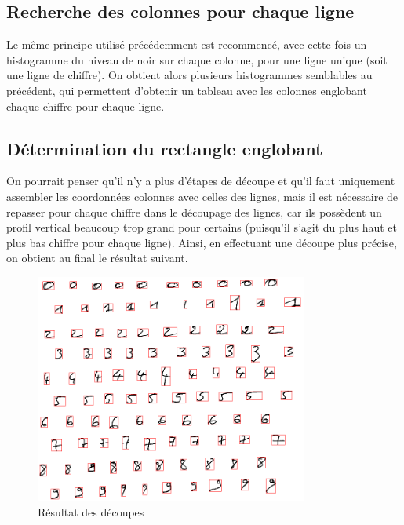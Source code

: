 \subsection{Recherche des colonnes pour chaque ligne}
Le même principe utilisé précédemment est recommencé, avec cette fois un histogramme du niveau de noir sur chaque colonne, pour une ligne unique (soit une ligne de chiffre). On obtient alors plusieurs histogrammes semblables au précédent, qui permettent d'obtenir un tableau avec les colonnes englobant chaque chiffre pour chaque ligne. 

\subsection{Détermination du rectangle englobant}
On pourrait penser qu'il n'y a plus d'étapes de découpe et qu'il faut uniquement assembler les coordonnées colonnes avec celles des lignes, mais il est nécessaire de repasser pour chaque chiffre dans le découpage des lignes, car ils possèdent un profil vertical beaucoup trop grand pour certains (puisqu'il s'agit du plus haut et plus bas chiffre pour chaque ligne). Ainsi, en effectuant une découpe plus précise, on obtient au final le résultat suivant.

\begin{figure}[hm]
	\begin{center}
		\includegraphics[width=0.8\textwidth]{img/11-final-cut.png} 
	\end{center}
	\caption{Résultat des découpes}
\end{figure}

